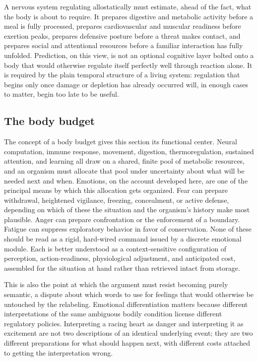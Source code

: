 \documentclass[11pt]{article}
\begin{document}
A nervous system regulating allostatically must estimate, ahead of the fact, what the body is about to require. It prepares digestive and metabolic activity before a meal is fully processed, prepares cardiovascular and muscular readiness before exertion peaks, prepares defensive posture before a threat makes contact, and prepares social and attentional resources before a familiar interaction has fully unfolded. Prediction, on this view, is not an optional cognitive layer bolted onto a body that would otherwise regulate itself perfectly well through reaction alone. It is required by the plain temporal structure of a living system: regulation that begins only once damage or depletion has already occurred will, in enough cases to matter, begin too late to be useful.

\subsection{The body budget}

The concept of a body budget gives this section its functional center. Neural computation, immune response, movement, digestion, thermoregulation, sustained attention, and learning all draw on a shared, finite pool of metabolic resources, and an organism must allocate that pool under uncertainty about what will be needed next and when. Emotions, on the account developed here, are one of the principal means by which this allocation gets organized. Fear can prepare withdrawal, heightened vigilance, freezing, concealment, or active defense, depending on which of these the situation and the organism's history make most plausible. Anger can prepare confrontation or the enforcement of a boundary. Fatigue can suppress exploratory behavior in favor of conservation. None of these should be read as a rigid, hard-wired command issued by a discrete emotional module. Each is better understood as a context-sensitive configuration of perception, action-readiness, physiological adjustment, and anticipated cost, assembled for the situation at hand rather than retrieved intact from storage.

This is also the point at which the argument must resist becoming purely semantic, a dispute about which words to use for feelings that would otherwise be untouched by the relabeling. Emotional differentiation matters because different interpretations of the same ambiguous bodily condition license different regulatory policies. Interpreting a racing heart as danger and interpreting it as excitement are not two descriptions of an identical underlying event; they are two different preparations for what should happen next, with different costs attached to getting the interpretation wrong.
\end{document}
